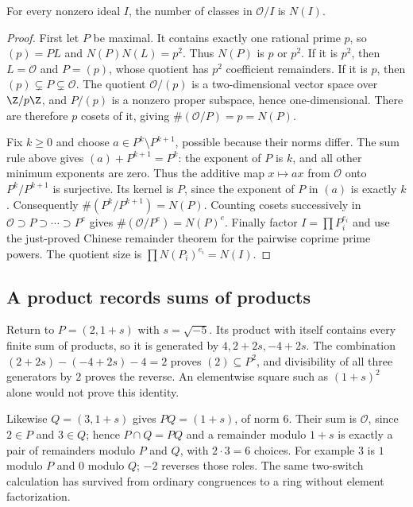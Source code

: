\begin{proposition}\label{prop:t1-norm-index}
For every nonzero ideal $I$, the number of classes in $\mathcal O/I$
is $N(I)$.
\end{proposition}
\begin{proof}
First let $P$ be maximal. It contains exactly one rational prime $p$,
so $(p)=PL$ and $N(P)N(L)=p^2$. Thus $N(P)$ is $p$ or $p^2$.
If it is $p^2$, then $L=\mathcal O$ and $P=(p)$, whose quotient has
$p^2$ coefficient remainders. If it is $p$, then
$(p)\subsetneq P\subsetneq\mathcal O$. The quotient
$\mathcal O/(p)$ is a two-dimensional vector space over $\Z/p\Z$,
and $P/(p)$ is a nonzero proper subspace, hence one-dimensional.
There are therefore $p$ cosets of it, giving
$\#(\mathcal O/P)=p=N(P)$.

Fix $k\ge0$ and choose $a\in P^k\setminus P^{k+1}$, possible because
their norms differ. The sum rule above gives
$(a)+P^{k+1}=P^k$: the exponent of $P$ is $k$, and all other
minimum exponents are zero. Thus the additive map
$x\mapsto ax$ from $\mathcal O$ onto $P^k/P^{k+1}$
is surjective. Its kernel is $P$, since the exponent of $P$
in $(a)$ is exactly $k$. Consequently
$\#(P^k/P^{k+1})=N(P)$.
Counting cosets successively in
$\mathcal O\supset P\supset\cdots\supset P^e$ gives
$\#(\mathcal O/P^e)=N(P)^e$.
Finally factor $I=\prod P_i^{e_i}$ and use the just-proved
Chinese remainder theorem for the pairwise coprime prime powers.
The quotient size is $\prod N(P_i)^{e_i}=N(I)$.
\end{proof}

\subsection*{A product records sums of products}
Return to $P=(2,1+s)$ with $s=\sqrt{-5}$.
Its product with itself contains every finite sum of products,
so it is generated by $4,2+2s,-4+2s$.
The combination
$(2+2s)-(-4+2s)-4=2$ proves $(2)\subseteq P^2$,
and divisibility of all three generators by $2$ proves the reverse.
An elementwise square such as $(1+s)^2$ alone would not prove this identity.

Likewise $Q=(3,1+s)$ gives $PQ=(1+s)$, of norm $6$.
Their sum is $\mathcal O$, since $2\in P$ and $3\in Q$;
hence $P\cap Q=PQ$ and a remainder modulo $1+s$ is exactly
a pair of remainders modulo $P$ and $Q$, with $2\cdot3=6$ choices.
For example $3$ is $1$ modulo $P$ and $0$ modulo $Q$;
$-2$ reverses those roles. The same two-switch calculation has
survived from ordinary congruences to a ring without element factorization.

